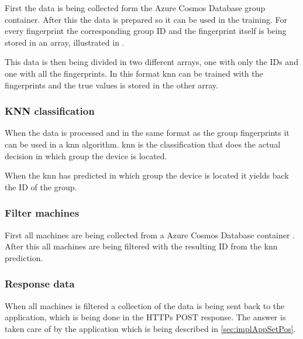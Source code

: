 \bigskip

First the data is being collected form the Azure Cosmos Database \cite{IntroductionAzureCosmos} group container. 
After this the data is prepared so it can be used in the training.
For every fingerprint the corresponding group ID and the fingerprint itself is being stored in an array, illustrated in .


This data is then being divided in two different arrays, one with only the IDs and one with all the fingerprints.
In this format \acrshort{knn} can be trained with the fingerprints and the true values is stored in the other array.


\subsubsection{KNN classification}\label{sec:implServerSetPosKnnClassification}
When the data is processed and in the same format as the group fingerprints it can be used in a \acrshort{knn} algorithm.
\acrshort{knn} is the classification that does the actual decision in which group the device is located.

\bigskip

When the \acrshort{knn} has predicted in which group the device is located it yields back the ID of the group. 

\subsubsection{Filter machines}\label{sec:implServerSetPosFilterMachines}
First all machines are being collected from a Azure Cosmos Database container \cite{IntroductionAzureCosmos}.
After this all machines are being filtered with the resulting ID from the \acrshort{knn} prediction.

\subsubsection{Response data}\label{sec:implServerSetPosResponse}
When all machines is filtered a collection of the data is being sent back to the application, which is being done in the HTTPs POST response.
The answer is taken care of by the application which is being described in \cref{sec:implAppSetPos}.

